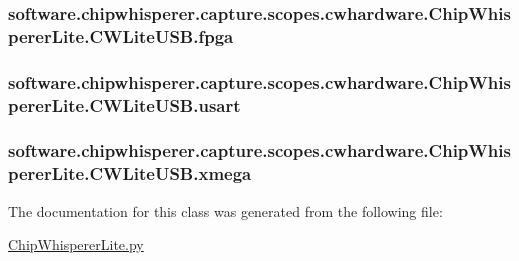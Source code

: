 \subsubsection[{fpga}]{\setlength{\rightskip}{0pt plus 5cm}software.\+chipwhisperer.\+capture.\+scopes.\+cwhardware.\+Chip\+Whisperer\+Lite.\+C\+W\+Lite\+U\+S\+B.\+fpga}\label{classsoftware_1_1chipwhisperer_1_1capture_1_1scopes_1_1cwhardware_1_1ChipWhispererLite_1_1CWLiteUSB_a1cb11a0145bd9fd9bec059aada1a9378}
\hypertarget{classsoftware_1_1chipwhisperer_1_1capture_1_1scopes_1_1cwhardware_1_1ChipWhispererLite_1_1CWLiteUSB_aa30f92d3d6dd15f55b70fd615f0ab73f}{}
\subsubsection[{usart}]{\setlength{\rightskip}{0pt plus 5cm}software.\+chipwhisperer.\+capture.\+scopes.\+cwhardware.\+Chip\+Whisperer\+Lite.\+C\+W\+Lite\+U\+S\+B.\+usart}\label{classsoftware_1_1chipwhisperer_1_1capture_1_1scopes_1_1cwhardware_1_1ChipWhispererLite_1_1CWLiteUSB_aa30f92d3d6dd15f55b70fd615f0ab73f}
\hypertarget{classsoftware_1_1chipwhisperer_1_1capture_1_1scopes_1_1cwhardware_1_1ChipWhispererLite_1_1CWLiteUSB_a20b04ca20944f70eb286cfc8cc379ee4}{}
\subsubsection[{xmega}]{\setlength{\rightskip}{0pt plus 5cm}software.\+chipwhisperer.\+capture.\+scopes.\+cwhardware.\+Chip\+Whisperer\+Lite.\+C\+W\+Lite\+U\+S\+B.\+xmega}\label{classsoftware_1_1chipwhisperer_1_1capture_1_1scopes_1_1cwhardware_1_1ChipWhispererLite_1_1CWLiteUSB_a20b04ca20944f70eb286cfc8cc379ee4}


The documentation for this class was generated from the following file\+:\begin{DoxyCompactItemize}
\item 
\hyperlink{ChipWhispererLite_8py}{Chip\+Whisperer\+Lite.\+py}\end{DoxyCompactItemize}
